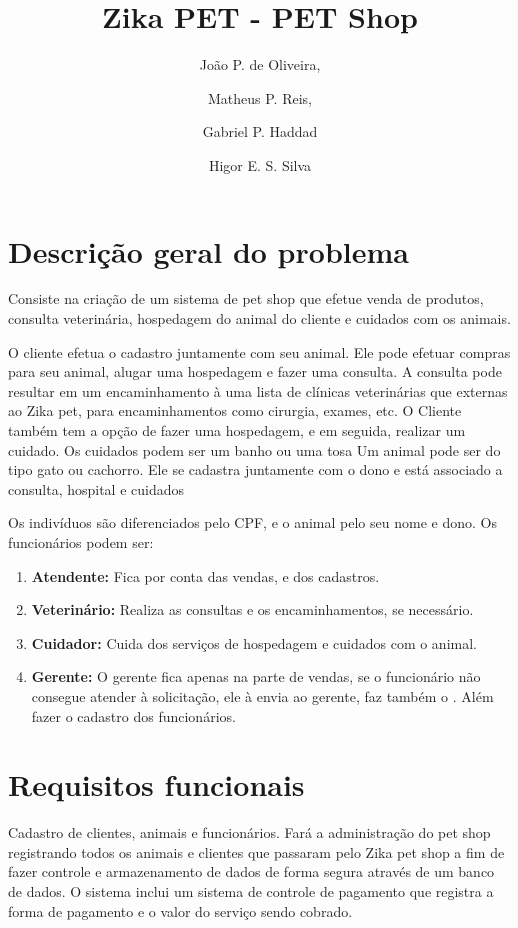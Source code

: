 \documentclass[12pt]{article}
\begin{document}
 \title{Zika PET - PET Shop}
\author{
	João P. de Oliveira,
    \and
    Matheus P. Reis,
    \and
     Gabriel P. Haddad
    \and
    Higor E. S. Silva
}
  \newpage                 
 \maketitle
 \newpage                 %
 \tableofcontents         %
  \newpage                 %
 \section{Descrição geral do problema}
 Consiste na criação de um sistema de pet shop que efetue venda de produtos, consulta veterinária, hospedagem do animal do cliente e cuidados com os animais.
 
 O cliente efetua o cadastro juntamente com seu animal. Ele pode efetuar compras para seu animal, alugar uma hospedagem e fazer uma consulta. A consulta pode resultar em um encaminhamento à uma lista de clínicas veterinárias que externas ao Zika pet, para encaminhamentos como cirurgia, exames, etc. 
 O Cliente também tem a opção de fazer uma hospedagem, e em seguida, realizar um cuidado. Os cuidados podem ser um banho ou uma tosa 
 Um animal pode ser do tipo gato ou cachorro. Ele se cadastra juntamente com o  dono e está associado a consulta, hospital e cuidados
 
 Os indivíduos são diferenciados pelo CPF, e o animal pelo seu nome e dono. Os funcionários podem ser:
 
\begin{enumerate}
\item \textbf{Atendente:} Fica por conta das vendas, e dos cadastros.

\item \textbf{Veterinário:} Realiza as consultas e os encaminhamentos, se necessário.

\item \textbf{Cuidador:} Cuida dos serviços de hospedagem e cuidados com o animal.

\item \textbf{Gerente:} O gerente fica apenas na parte de vendas, se o funcionário não consegue atender à solicitação, ele à envia ao gerente, faz também o . Além fazer o cadastro dos funcionários.
\end{enumerate}
 
 \section{Requisitos funcionais}%
 Cadastro de clientes, animais e funcionários. Fará a administração do pet shop registrando todos os animais e clientes que passaram pelo Zika pet shop a fim de fazer controle e armazenamento de dados de forma segura através de um banco de dados. O sistema inclui um sistema de controle de pagamento que registra a forma de pagamento e o valor do serviço sendo cobrado.
 
\end{document}
